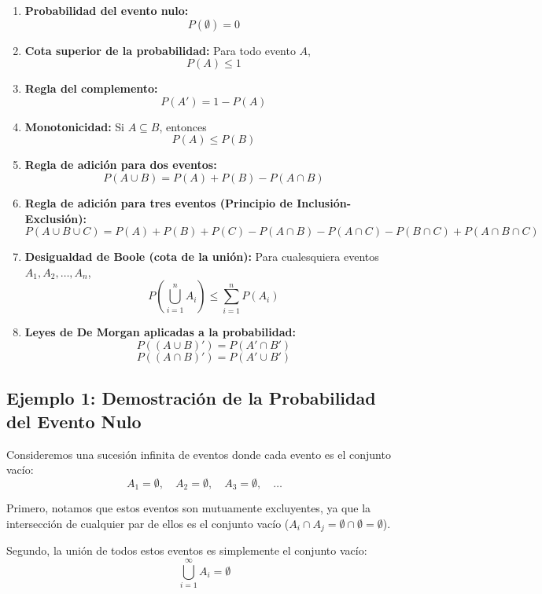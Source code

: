 \begin{enumerate}
    \item \textbf{Probabilidad del evento nulo:}
    $$ P(\emptyset) = 0 $$

    \item \textbf{Cota superior de la probabilidad:} Para todo evento $A$,
    $$ P(A) \le 1 $$

    \item \textbf{Regla del complemento:} 
    $$ P(A') = 1 - P(A) $$

    \item \textbf{Monotonicidad:} Si $A \subseteq B$, entonces
    $$ P(A) \le P(B) $$

    \item \textbf{Regla de adición para dos eventos:}
    $$ P(A \cup B) = P(A) + P(B) - P(A \cap B) $$

    \item \textbf{Regla de adición para tres eventos (Principio de Inclusión-Exclusión):}
    $$ P(A \cup B \cup C) = P(A) + P(B) + P(C) - P(A \cap B) - P(A \cap C) - P(B \cap C) + P(A \cap B \cap C) $$

    \item \textbf{Desigualdad de Boole (cota de la unión):} Para cualesquiera eventos $A_1, A_2, \dots, A_n$,
    $$ P\left(\bigcup_{i=1}^{n} A_i\right) \le \sum_{i=1}^{n} P(A_i) $$

    \item \textbf{Leyes de De Morgan aplicadas a la probabilidad:}
    $$ P\left((A \cup B)'\right) = P(A' \cap B') $$
    $$ P\left((A \cap B)'\right) = P(A' \cup B') $$
\end{enumerate}



\subsection{Ejemplo 1: Demostración de la Probabilidad del Evento Nulo}

Consideremos una sucesión infinita de eventos donde cada evento es el conjunto vacío:
$$ A_1 = \emptyset, \quad A_2 = \emptyset, \quad A_3 = \emptyset, \quad \dots $$

Primero, notamos que estos eventos son mutuamente excluyentes, ya que la intersección de cualquier par de ellos es el conjunto vacío ($A_i \cap A_j = \emptyset \cap \emptyset = \emptyset$). 

Segundo, la unión de todos estos eventos es simplemente el conjunto vacío:
$$ \bigcup_{i=1}^{\infty} A_i = \emptyset $$

